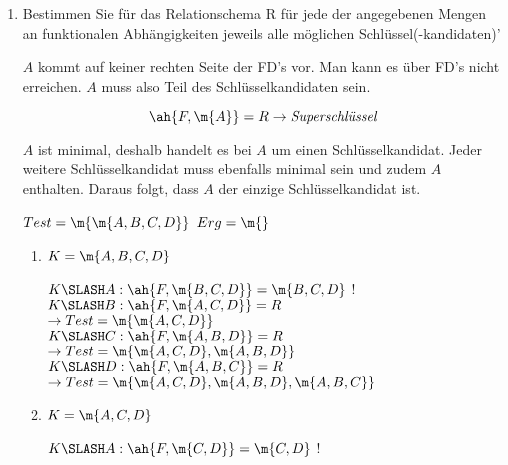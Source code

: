 \documentclass{bschlangaul-aufgabe}
\begin{document}
\begin{enumerate}

%

\item Bestimmen Sie für das Relationschema R für jede der angegebenen
Mengen an funktionalen Abhängigkeiten jeweils alle möglichen
Schlüssel(-kandidaten)'

\begin{bAntwort}

$A$ kommt auf keiner rechten Seite der FD’s vor.
Man kann es über FD's nicht erreichen. $A$ muss also Teil des
Schlüsselkandidaten sein.

\begin{displaymath}
\ah{F, \m{A}} = R \rightarrow \textit{Superschlüssel}
\end{displaymath}

$A$ ist minimal, deshalb handelt es bei $A$ um einen Schlüsselkandidat.
Jeder weitere Schlüsselkandidat muss ebenfalls minimal sein und zudem
$A$ enthalten. Daraus folgt, dass $A$ der einzige Schlüsselkandidat ist.

%


$Test = \m{\m{A, B, C, D}}$ $Erg = \m{}$

\begin{enumerate}


\item $K = \m{A, B, C, D}$

$K \SLASH A: \ah{F, \m{B, C, D}} = \m{B, C, D}$ !\\

$K \SLASH B: \ah{F, \m{A, C, D}} = R$\\
$\rightarrow Test = \m{\m{A, C, D}}$ \\

$K \SLASH C: \ah{F, \m{A, B, D}} = R$\\
$\rightarrow Test = \m{\m{A, C, D}, \m{A, B, D}}$ \\

$K \SLASH D: \ah{F, \m{A, B, C}} = R$\\
$\rightarrow Test = \m{\m{A, C, D}, \m{A, B, D}, \m{A, B, C}}$ \\


\item $K = \m{A, C, D}$

$K \SLASH A: \ah{F, \m{C, D}} = \m{C, D}$ !\\


\end{enumerate}
\end{bAntwort}
\end{enumerate}
\end{document}
